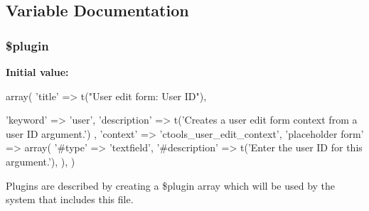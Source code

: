 \subsection{Variable Documentation}
\hypertarget{plugins_2arguments_2user__edit_8inc_ada8a7130088351710bb02ed622d6bf65}{
\subsubsection[{\$plugin}]{\setlength{\rightskip}{0pt plus 5cm}\$plugin}}
\label{plugins_2arguments_2user__edit_8inc_ada8a7130088351710bb02ed622d6bf65}
{\bfseries Initial value:}
\begin{DoxyCode}
 array(
  'title' => t("User edit form: User ID"),
  
  'keyword' => 'user',
  'description' => t('Creates a user edit form context from a user ID argument.')
      ,
  'context' => 'ctools_user_edit_context',
  'placeholder form' => array(
    '#type' => 'textfield',
    '#description' => t('Enter the user ID for this argument.'),
  ),
)
\end{DoxyCode}
Plugins are described by creating a \$plugin array which will be used by the system that includes this file. 